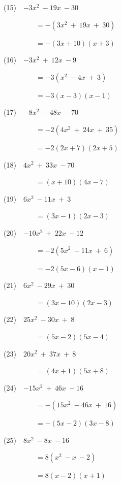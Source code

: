 \documentclass[a4j,twocolumn,10pt,fleqn]{jarticle}
\begin{document}
(15)~~$-3x^2~-19x~-30$

~~~~~~~~~$=-(3x^2~+~19x~+~30)$

~~~~~~~~~$=-(3x+10)(x+3)$

(16)~~$-3x^2~+~12x~-9$

~~~~~~~~~$=-3(x^2~-4x~+~3)$

~~~~~~~~~$=-3(x-3)(x-1)$

(17)~~$-8x^2~-48x~-70$

~~~~~~~~~$=-2(4x^2~+~24x~+~35)$

~~~~~~~~~$=-2(2x+7)(2x+5)$

(18)~~$4x^2~+~33x~-70$

~~~~~~~~~$=(x+10)(4x-7)$

(19)~~$6x^2~-11x~+~3$

~~~~~~~~~$=(3x-1)(2x-3)$

(20)~~$-10x^2~+~22x~-12$

~~~~~~~~~$=-2(5x^2~-11x~+~6)$

~~~~~~~~~$=-2(5x-6)(x-1)$

(21)~~$6x^2~-29x~+~30$

~~~~~~~~~$=(3x-10)(2x-3)$

(22)~~$25x^2~-30x~+~8$

~~~~~~~~~$=(5x-2)(5x-4)$

(23)~~$20x^2~+~37x~+~8$

~~~~~~~~~$=(4x+1)(5x+8)$

(24)~~$-15x^2~+~46x~-16$

~~~~~~~~~$=-(15x^2~-46x~+~16)$

~~~~~~~~~$=-(5x-2)(3x-8)$

(25)~~$8x^2~-8x~-16$

~~~~~~~~~$=8(x^2~-x~-2)$

~~~~~~~~~$=8(x-2)(x+1)$
\end{document}
